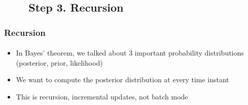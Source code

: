 \documentclass{beamer}
\begin{document}







\subsection{\ \ \ \ Step 3. Recursion}
\begin{frame}
\frametitle{Recursion}
\framesubtitle{}
\mypagenum
\begin{itemize}
\item In Bayes' theorem, we talked about 3 important probability distributions (posterior, prior, likelihood)
\item We want to compute the posterior distribution at every time instant
\item This is recursion, incremental updates, not batch mode
\end{itemize}
\end{frame}
\end{document}
